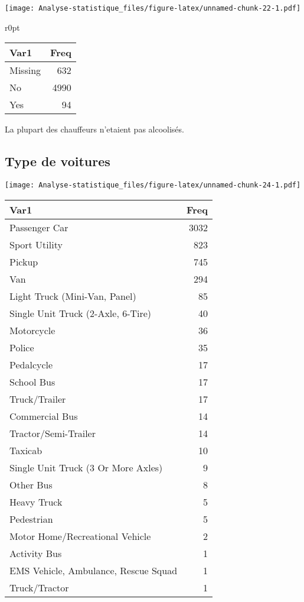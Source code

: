 \documentclass[
  french,
]{article}
\begin{document}
\texttt{[image: Analyse-statistique\_files/figure-latex/unnamed-chunk-22-1.pdf]}

\begin{wraptable}{r}{0pt}
\begin{tabular}{l|r}
\hline
Var1 & Freq\\
\hline
Missing & 632\\
\hline
No & 4990\\
\hline
Yes & 94\\
\hline
\end{tabular}\end{wraptable}

La plupart des chauffeurs n'etaient pas alcoolisés.

\hypertarget{type-de-voitures}{%
\subsection{Type de voitures}\label{type-de-voitures}}

\texttt{[image: Analyse-statistique\_files/figure-latex/unnamed-chunk-24-1.pdf]}

\begin{table}
\centering
\begin{tabular}{l|r}
\hline
Var1 & Freq\\
\hline
Passenger Car & 3032\\
\hline
Sport Utility & 823\\
\hline
Pickup & 745\\
\hline
Van & 294\\
\hline
Light Truck (Mini-Van, Panel) & 85\\
\hline
Single Unit Truck (2-Axle, 6-Tire) & 40\\
\hline
Motorcycle & 36\\
\hline
Police & 35\\
\hline
Pedalcycle & 17\\
\hline
School Bus & 17\\
\hline
Truck/Trailer & 17\\
\hline
Commercial Bus & 14\\
\hline
Tractor/Semi-Trailer & 14\\
\hline
Taxicab & 10\\
\hline
Single Unit Truck (3 Or More Axles) & 9\\
\hline
Other Bus & 8\\
\hline
Heavy Truck & 5\\
\hline
Pedestrian & 5\\
\hline
Motor Home/Recreational Vehicle & 2\\
\hline
Activity Bus & 1\\
\hline
EMS Vehicle, Ambulance, Rescue Squad & 1\\
\hline
Truck/Tractor & 1\\
\hline
\end{tabular}
\end{table}
\end{document}
